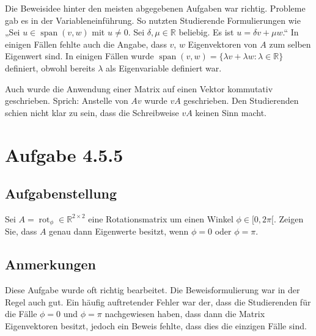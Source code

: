 \documentclass[a4paper]{article}
\newcommand*{\R}{\mathbb R}
\begin{document}
Die Beweisidee hinter den meisten abgegebenen Aufgaben war richtig. Probleme gab es in der Variableneinführung. So nutzten Studierende Formulierungen wie „Sei $u\in\operatorname{span}(v,w)$ mit $u\neq 0$. Sei $\delta,\mu\in\R$ beliebig. Es ist $u=\delta v + \mu w$.“ In einigen Fällen fehlte auch die Angabe, dass $v$, $w$ Eigenvektoren von $A$ zum selben Eigenwert sind. In einigen Fällen wurde $\operatorname{span}(v,w) = \{ \lambda v + \lambda w : \lambda \in\R\}$ definiert, obwohl bereits $\lambda$ als Eigenvariable definiert war.

Auch wurde die Anwendung einer Matrix auf einen Vektor kommutativ geschrieben. Sprich: Anstelle von $Av$ wurde $vA$ geschrieben. Den Studierenden schien nicht klar zu sein, dass die Schreibweise $vA$ keinen Sinn macht.

\section{Aufgabe 4.5.5}

\subsection{Aufgabenstellung}

Sei $A=\operatorname{rot}_\phi\in\R^{2\times 2}$ eine Rotationsmatrix um einen Winkel $\phi\in[0,2\pi[$. Zeigen Sie, dass $A$ genau dann Eigenwerte besitzt, wenn $\phi = 0$ oder $\phi = \pi$.

\subsection{Anmerkungen}

Diese Aufgabe wurde oft richtig bearbeitet. Die Beweisformulierung war in der Regel auch gut. Ein häufig auftretender Fehler war der, dass die Studierenden für die Fälle $\phi=0$ und $\phi=\pi$ nachgewiesen haben, dass dann die Matrix Eigenvektoren besitzt, jedoch ein Beweis fehlte, dass dies die einzigen Fälle sind.
\end{document}
